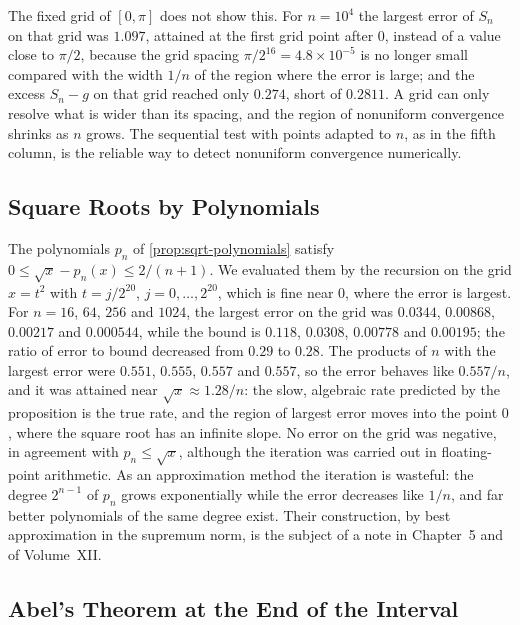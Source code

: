 The fixed grid of $[0,\pi]$ does not show this. For $n=10^4$ the largest error of $S_n$ on that grid was $1.097$, attained at the first grid point after $0$, instead of a value close to $\pi/2$, because the grid spacing $\pi/2^{16}=4.8\times10^{-5}$ is no longer small compared with the width $1/n$ of the region where the error is large; and the excess $S_n-g$ on that grid reached only $0.274$, short of $0.2811$. A grid can only resolve what is wider than its spacing, and the region of nonuniform convergence shrinks as $n$ grows. The sequential test with points adapted to $n$, as in the fifth column, is the reliable way to detect nonuniform convergence numerically.

\subsection{Square Roots by Polynomials}

The polynomials $p_n$ of \cref{prop:sqrt-polynomials} satisfy $0\le\sqrt x-p_n(x)\le2/(n+1)$. We evaluated them by the recursion on the grid $x=t^2$ with $t=j/2^{20}$, $j=0,\ldots,2^{20}$, which is fine near $0$, where the error is largest. For $n=16$, $64$, $256$ and $1024$, the largest error on the grid was $0.0344$, $0.00868$, $0.00217$ and $0.000544$, while the bound is $0.118$, $0.0308$, $0.00778$ and $0.00195$; the ratio of error to bound decreased from $0.29$ to $0.28$. The products of $n$ with the largest error were $0.551$, $0.555$, $0.557$ and $0.557$, so the error behaves like $0.557/n$, and it was attained near $\sqrt x\approx1.28/n$: the slow, algebraic rate predicted by the proposition is the true rate, and the region of largest error moves into the point $0$, where the square root has an infinite slope. No error on the grid was negative, in agreement with $p_n\le\sqrt x$, although the iteration was carried out in floating-point arithmetic. As an approximation method the iteration is wasteful: the degree $2^{n-1}$ of $p_n$ grows exponentially while the error decreases like $1/n$, and far better polynomials of the same degree exist. Their construction, by best approximation in the supremum norm, is the subject of a note in Chapter~5 and of Volume~XII.

\subsection{Abel's Theorem at the End of the Interval}

